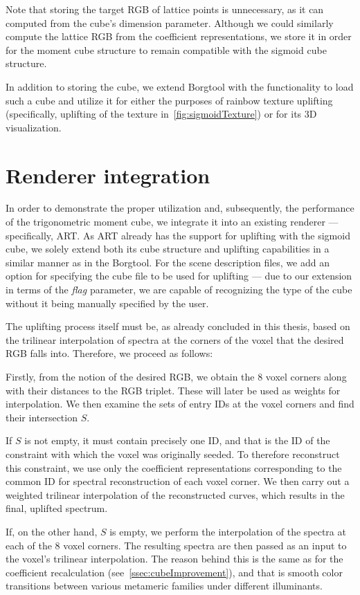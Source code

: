 Note that storing the target RGB of lattice points is unnecessary, as it can computed from the cube's dimension parameter. Although we could similarly compute the lattice RGB from the coefficient representations, we store it in order for the moment cube structure to remain compatible with the sigmoid cube structure. 

In addition to storing the cube, we extend Borgtool with the functionality to load such a cube and utilize it for either the purposes of rainbow texture uplifting (specifically, uplifting of the texture in~\cref{fig:sigmoidTexture}) or for its 3D visualization.

\section{Renderer integration} \label{sec:rendererIntegration}

In order to demonstrate the proper utilization and, subsequently, the performance of the trigonometric moment cube, we integrate it into an existing renderer --- specifically, ART. As ART already has the support for uplifting with the sigmoid cube, we solely extend both its cube structure and uplifting capabilities in a similar manner as in the Borgtool. For the scene description files, we add an option for specifying the cube file to be used for uplifting --- due to our extension in terms of the \emph{flag} parameter, we are capable of recognizing the type of the cube without it being manually specified by the user.

The uplifting process itself must be, as already concluded in this thesis, based on the trilinear interpolation of spectra at the corners of the voxel that the desired RGB falls into. Therefore, we proceed as follows:

Firstly, from the notion of the desired RGB, we obtain the 8 voxel corners along with their distances to the RGB triplet. These will later be used as weights for interpolation. We then examine the sets of entry IDs at the voxel corners and find their intersection $S$.

If $S$ is not empty, it must contain precisely one ID, and that is the ID of the constraint with which the voxel was originally seeded. To therefore reconstruct this constraint, we use only the coefficient representations corresponding to the common ID for spectral reconstruction of each voxel corner. We then carry out a weighted trilinear interpolation of the reconstructed curves, which results in the final, uplifted spectrum.

If, on the other hand, $S$ is empty, we perform the interpolation of the spectra at each of the 8 voxel corners. The resulting spectra are then passed as an input to the voxel's trilinear interpolation. The reason behind this is the same as for the coefficient recalculation (see~\cref{ssec:cubeImprovement}), and that is smooth color transitions between various metameric families under different illuminants.